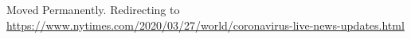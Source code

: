 Moved Permanently. Redirecting to
\url{https://www.nytimes.com/2020/03/27/world/coronavirus-live-news-updates.html}
